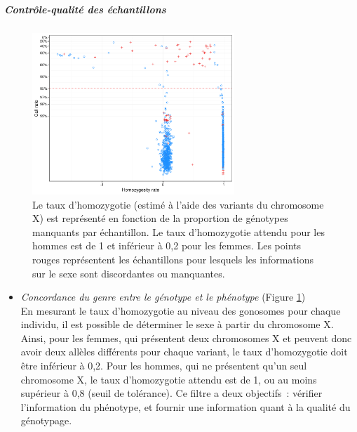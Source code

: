 \documentclass[11pt,a4paper,notrimn]{krantz}
\providecommand{\tightlist}{%
  \setlength{\itemsep}{0pt}\setlength{\parskip}{0pt}}
\let\oldsubparagraph\subparagraph
\renewcommand{\subparagraph}[1]{\oldsubparagraph{#1}\mbox{}}
\theoremstyle{definition}
\theoremstyle{definition}
\theoremstyle{remark}
\begin{document}
\subparagraph{Contrôle-qualité des échantillons}\label{QCgenomique}








\begin{figure}[!htb]

{\centering \includegraphics[width=3in,height=2.4in]{FiguresTables/gendercheck} 

}

\caption{Le taux d'homozygotie (estimé à l'aide des variants du
chromosome X) est représenté en fonction de la proportion de génotypes
manquants par échantillon. Le taux d'homozygotie attendu pour les hommes
est de 1 et inférieur à 0,2 pour les femmes. Les points rouges
représentent les échantillons pour lesquels les informations sur le sexe
sont discordantes ou manquantes.}\label{fig:gendercheck}
\end{figure}

\begin{itemize}
\tightlist
\item
  \emph{Concordance du genre entre le génotype et le phénotype} (Figure
  \ref{fig:gendercheck})\\
  En mesurant le taux d'homozygotie au niveau des gonosomes pour chaque
  individu, il est possible de déterminer le sexe à partir du chromosome
  X. Ainsi, pour les femmes, qui présentent deux chromosomes X et
  peuvent donc avoir deux allèles différents pour chaque variant, le
  taux d'homozygotie doit être inférieur à 0,2. Pour les hommes, qui ne
  présentent qu'un seul chromosome X, le taux d'homozygotie attendu est
  de 1, ou au moins supérieur à 0,8 (seuil de tolérance). Ce filtre a
  deux objectifs~: vérifier l'information du phénotype, et fournir une
  information quant à la qualité du génotypage.
\end{itemize}
\end{document}
